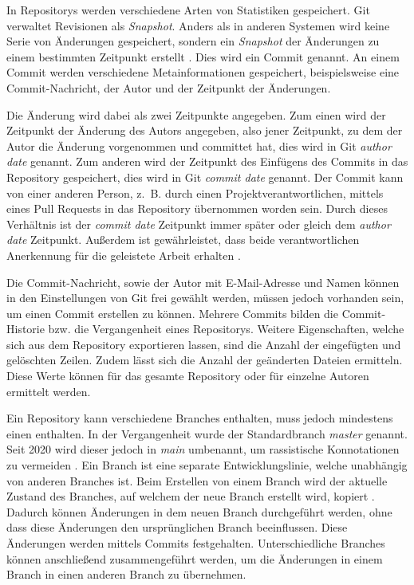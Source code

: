 In Repositorys werden verschiedene Arten von Statistiken gespeichert.
Git verwaltet Revisionen als \emph{Snapshot}.
Anders als in anderen Systemen wird keine Serie von Änderungen gespeichert, sondern ein \emph{Snapshot} der Änderungen zu einem bestimmten Zeitpunkt erstellt \autocite{ponuthorai_version_2022}.
Dies wird ein Commit genannt.
An einem Commit werden verschiedene Metainformationen gespeichert, beispielsweise eine Commit-Nachricht, der Autor und der Zeitpunkt der Änderungen.

Die Änderung wird dabei als zwei Zeitpunkte angegeben.
Zum einen wird der Zeitpunkt der Änderung des Autors angegeben, also jener Zeitpunkt, zu dem der Autor die Änderung vorgenommen und committet hat, dies wird in Git \emph{author date} genannt.
Zum anderen wird der Zeitpunkt des Einfügens des Commits in das Repository gespeichert, dies wird in Git \emph{commit date} genannt.
Der Commit kann von einer anderen Person, z. B. durch einen Projektverantwortlichen, mittels eines Pull Requests in das Repository übernommen worden sein.
Durch dieses Verhältnis ist der \emph{commit date} Zeitpunkt immer später oder gleich dem \emph{author date} Zeitpunkt.
Außerdem ist gewährleistet, dass beide verantwortlichen Anerkennung für die geleistete Arbeit erhalten \autocite{chacon_pro_2024}.

Die Commit-Nachricht, sowie der Autor mit E-Mail-Adresse und Namen können in den Einstellungen von Git frei gewählt werden, müssen jedoch vorhanden sein, um einen Commit erstellen zu können.
Mehrere Commits bilden die Commit-Historie bzw. die Vergangenheit eines Repositorys.
Weitere Eigenschaften, welche sich aus dem Repository exportieren lassen, sind die Anzahl der eingefügten und gelöschten Zeilen.
Zudem lässt sich die Anzahl der geänderten Dateien ermitteln.
Diese Werte können für das gesamte Repository oder für einzelne Autoren ermittelt werden.

Ein Repository kann verschiedene Branches enthalten, muss jedoch mindestens einen enthalten.
In der Vergangenheit wurde der Standardbranch \emph{master} genannt.
Seit 2020 wird dieser jedoch in \emph{main} umbenannt, um rassistische Konnotationen zu vermeiden \autocite{github_githubrenaming_2024}.
Ein Branch ist eine separate Entwicklungslinie, welche unabhängig von anderen Branches ist.
Beim Erstellen von einem Branch wird der aktuelle Zustand des Branches, auf welchem der neue Branch erstellt wird, kopiert \autocite{ponuthorai_version_2022}.
Dadurch können Änderungen in dem neuen Branch durchgeführt werden, ohne dass diese Änderungen den ursprünglichen Branch beeinflussen.
Diese Änderungen werden mittels Commits festgehalten.
Unterschiedliche Branches können anschließend zusammengeführt werden, um die Änderungen in einem Branch in einen anderen Branch zu übernehmen.

